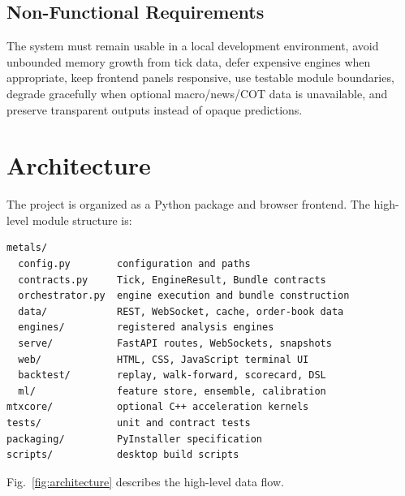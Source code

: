 \documentclass[conference]{IEEEtran}
\begin{document}
\subsection{Non-Functional Requirements}

The system must remain usable in a local development environment, avoid unbounded memory growth from
tick data, defer expensive engines when appropriate, keep frontend panels
responsive, use testable module boundaries, degrade gracefully when optional
macro/news/COT data is unavailable, and preserve transparent outputs instead
of opaque predictions.

\section{Architecture}

The project is organized as a Python package and browser frontend. The
high-level module structure is:

\begin{lstlisting}
metals/
  config.py        configuration and paths
  contracts.py     Tick, EngineResult, Bundle contracts
  orchestrator.py  engine execution and bundle construction
  data/            REST, WebSocket, cache, order-book data
  engines/         registered analysis engines
  serve/           FastAPI routes, WebSockets, snapshots
  web/             HTML, CSS, JavaScript terminal UI
  backtest/        replay, walk-forward, scorecard, DSL
  ml/              feature store, ensemble, calibration
mtxcore/           optional C++ acceleration kernels
tests/             unit and contract tests
packaging/         PyInstaller specification
scripts/           desktop build scripts
\end{lstlisting}

Fig.~\ref{fig:architecture} describes the high-level data flow.
\end{document}
